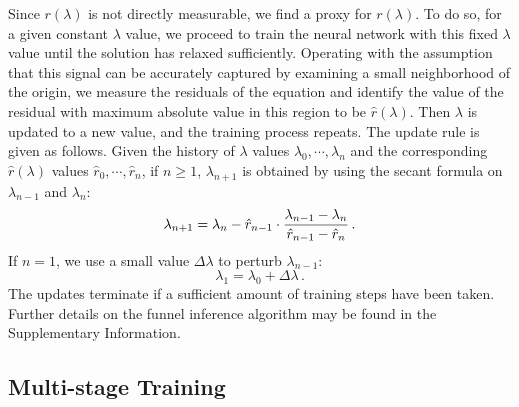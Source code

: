 \documentclass[fleqn,11pt]{wlscirep}
\begin{document}
Since $r(\lambda)$ is not directly measurable, we find a proxy for $r(\lambda)$. To do so, for a given constant $\lambda$ value, we proceed to train the neural network with this fixed $\lambda$ value until the solution has relaxed sufficiently. Operating with the assumption that this signal can be accurately captured by examining a small neighborhood of the origin, we measure the residuals of the equation and identify the value of the residual with maximum absolute value in this region to be $\hat{r}(\lambda)$. Then $\lambda$ is updated to a new value, and the training process repeats. The update rule is given as follows. Given the history of $\lambda$ values $\lambda_0, \cdots, \lambda_n$ and the corresponding $\hat{r}(\lambda)$ values $\hat{r}_0, \cdots, \hat{r}_n$, if $n \geq 1$, $\lambda_{n+1}$ is obtained by using the secant formula on $\lambda_{n-1}$ and $\lambda_{n}$:
\begin{equation}
    \lambda_{n+1} = \lambda_n - \hat{r}_{n-1} \cdot
    {\lambda_{n-1} - \lambda_n \over \hat{r}_{n-1} - \hat{r}_n} \,.
\end{equation}
If $n=1$, we use a small value $\Delta \lambda$ to perturb $\lambda_{n-1}$:
\begin{equation}
    \lambda_{1} = \lambda_0  + \Delta \lambda \,.
\end{equation}
The updates terminate if a sufficient amount of training steps have been taken. Further details on the funnel inference algorithm may be found in the Supplementary Information.


\subsection*{Multi-stage Training} \label{methods:multistage}
\end{document}
